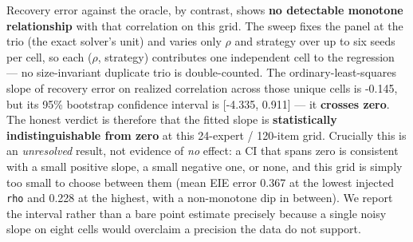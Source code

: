 \documentclass[
]{article}
\newcounter{none} %
\begin{document}
Recovery error against the oracle, by contrast, shows \textbf{no
detectable monotone relationship} with that correlation on this grid.
The sweep fixes the panel at the trio (the exact solver's unit) and
varies only \(\rho\) and strategy over up to six seeds per cell, so each
(\(\rho\), strategy) contributes one independent cell to the regression
--- no size-invariant duplicate trio is double-counted. The
ordinary-least-squares slope of recovery error on realized correlation
across those unique cells is -0.145, but its 95\% bootstrap confidence
interval is {[}-4.335, 0.911{]} --- it \textbf{crosses zero}. The honest
verdict is therefore that the fitted slope is \textbf{statistically
indistinguishable from zero} at this 24-expert / 120-item grid.
Crucially this is an \emph{unresolved} result, not evidence of \emph{no}
effect: a CI that spans zero is consistent with a small positive slope,
a small negative one, or none, and this grid is simply too small to
choose between them (mean EIE error 0.367 at the lowest injected
\texttt{rho} and 0.228 at the highest, with a non-monotone dip in
between). We report the interval rather than a bare point estimate
precisely because a single noisy slope on eight cells would overclaim a
precision the data do not support.
\end{document}
